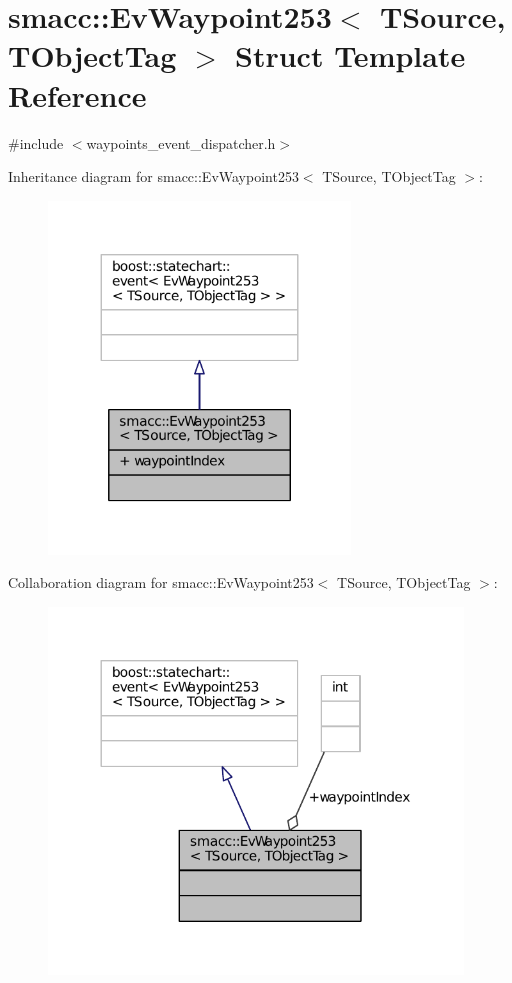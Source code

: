 \hypertarget{structsmacc_1_1EvWaypoint253}{}\section{smacc\+:\+:Ev\+Waypoint253$<$ T\+Source, T\+Object\+Tag $>$ Struct Template Reference}
\label{structsmacc_1_1EvWaypoint253}


{\ttfamily \#include $<$waypoints\+\_\+event\+\_\+dispatcher.\+h$>$}



Inheritance diagram for smacc\+:\+:Ev\+Waypoint253$<$ T\+Source, T\+Object\+Tag $>$\+:
\nopagebreak
\begin{figure}[H]
\begin{center}
\leavevmode
\includegraphics[width=227pt]{structsmacc_1_1EvWaypoint253__inherit__graph}
\end{center}
\end{figure}


Collaboration diagram for smacc\+:\+:Ev\+Waypoint253$<$ T\+Source, T\+Object\+Tag $>$\+:
\nopagebreak
\begin{figure}[H]
\begin{center}
\leavevmode
\includegraphics[width=312pt]{structsmacc_1_1EvWaypoint253__coll__graph}
\end{center}
\end{figure}
